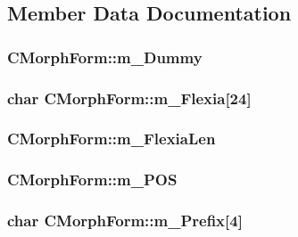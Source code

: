 \subsection{Member Data Documentation}
\hypertarget{structCMorphForm_a6592ec7427eeb8a570ae045b8b9d89d5}{
\subsubsection[{m\-\_\-\-Dummy}]{ C\-Morph\-Form\-::m\-\_\-\-Dummy}}\label{structCMorphForm_a6592ec7427eeb8a570ae045b8b9d89d5}
\hypertarget{structCMorphForm_ada33aea12ec0107484136cc4ce1903b9}{
\subsubsection[{m\-\_\-\-Flexia}]{\setlength{\rightskip}{0pt plus 5cm}char C\-Morph\-Form\-::m\-\_\-\-Flexia\mbox{[}24\mbox{]}}}\label{structCMorphForm_ada33aea12ec0107484136cc4ce1903b9}
\hypertarget{structCMorphForm_afe03dab48f9c9132cade2f9a02ed851b}{
\subsubsection[{m\-\_\-\-Flexia\-Len}]{ C\-Morph\-Form\-::m\-\_\-\-Flexia\-Len}}\label{structCMorphForm_afe03dab48f9c9132cade2f9a02ed851b}
\hypertarget{structCMorphForm_a88a8227da72a4f9e3fa09f83365d3f77}{
\subsubsection[{m\-\_\-\-P\-O\-S}]{ C\-Morph\-Form\-::m\-\_\-\-P\-O\-S}}\label{structCMorphForm_a88a8227da72a4f9e3fa09f83365d3f77}
\hypertarget{structCMorphForm_a4872d8bb505a8c4370606e8d17ea6a81}{
\subsubsection[{m\-\_\-\-Prefix}]{\setlength{\rightskip}{0pt plus 5cm}char C\-Morph\-Form\-::m\-\_\-\-Prefix\mbox{[}4\mbox{]}}}\label{structCMorphForm_a4872d8bb505a8c4370606e8d17ea6a81}
